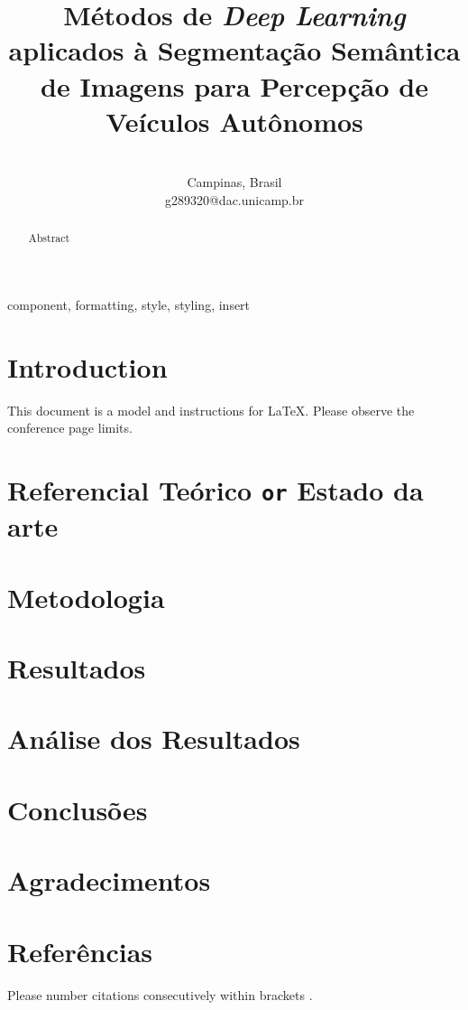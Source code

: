 \documentclass[conference]{IEEEtran}
\begin{document}
\title{\huge{Métodos de \textit{Deep Learning} aplicados\cite{jebamikyousAutonomousVehiclesPerception2022} à Segmentação Semântica de Imagens para Percepção de Veículos Autônomos}
}

\author{
\\
Campinas, Brasil \\
g289320@dac.unicamp.br}

\maketitle

\begin{abstract}
Abstract
\end{abstract}

\begin{IEEEkeywords}
component, formatting, style, styling, insert
\end{IEEEkeywords}

\section{Introduction}
This document is a model and instructions for \LaTeX.
Please observe the conference page limits. 

\section{Referencial Teórico \texttt{or} Estado da arte}


\section{Metodologia}


\section{Resultados}


\section{Análise dos Resultados}


\section{Conclusões}



\section*{Agradecimentos}



\section*{Referências}

Please number citations consecutively within brackets \cite{geron2019hands}. 



\end{document}
